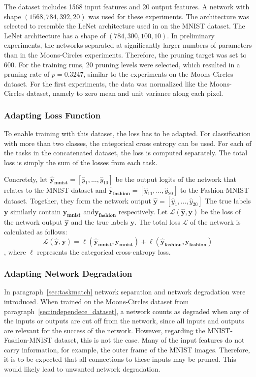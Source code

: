 The dataset includes 1568 input features and 20 output features.
A network with shape $(1568, 784, 392, 20)$ was used for these experiments.
The architecture was selected to resemble the LeNet architecture used in \autocite{LTH} on the MNIST dataset.
The LeNet architecture has a shape of $(784, 300, 100, 10)$.
In preliminary experiments, the networks separated at significantly larger numbers of parameters than in the Moons-Circles experiments.
Therefore, the pruning target was set to 600.
For the training runs, 20 pruning levels were selected, which resulted in a pruning rate of $p=0.3247$, similar to the experiments on the Moons-Circles dataset.
For the first experiments, the data was normalized like the Moons-Circles dataset, namely to zero mean and unit variance along each pixel.

\subsubsection{Adapting Loss Function}
To enable training with this dataset, the loss has to be adapted.
For classification with more than two classes, the categorical cross entropy can be used.
For each of the tasks in the concatenated dataset, the loss is computed separately.
The total loss is simply the sum of the losses from each task.

Concretely, let $\mathbf{\hat y_{mnist}} = \left[\hat y_1, \dots, \hat y_{10}\right]$ be the output logits of the network that relates to the MNIST dataset and $\mathbf{\hat y_{fashion}} = \left[\hat y_{11}, \dots, \hat y_{20}\right]$ to the Fashion-MNIST dataset.
Together, they form the network output $\mathbf{\hat y} = \left[\hat y_1, \dots, \hat y_{20}\right]$
The true labels $\mathbf{y}$ similarly contain $\mathbf{y_{mnist}}$ and$\mathbf{y_{fashion}}$ respectively.
Let $\mathcal{L} (\mathbf{\hat y}, \mathbf{y})$ be the loss of the network output $\mathbf{\hat y}$ and the true labels $\mathbf{y}$.
The total loss $\mathcal{L}$ of the network is calculated as follows:
\[
\mathcal{L}  (\mathbf{\hat y}, \mathbf{y})
= \ell  (\mathbf{\hat y_{mnist}}, \mathbf{y_{mnist}})
+ \ell (\mathbf{\hat y_{fashion}}, \mathbf{y_{fashion}})
\]
, where $\ell$ represents the categorical cross-entropy loss.

\subsubsection{Adapting Network Degradation}
In paragraph~\ref{sec:taskmatch} network separation and network degradation were introduced.
When trained on the Moons-Circles dataset from paragraph~\ref{sec:independece_dataset}, a network counts as degraded when any of the inputs or outputs are cut off from the network, since all inputs and outputs are relevant for the success of the network.
However, regarding the MNIST-Fashion-MNIST dataset, this is not the case.
Many of the input features do not carry information, for example, the outer frame of the MNIST images.
Therefore, it is to be expected that all connections to these inputs may be pruned.
This would likely lead to unwanted network degradation.


